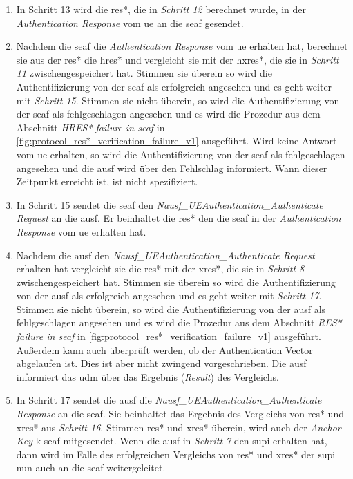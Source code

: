 \begin{enumerate}
\item In Schritt 13 wird die \gls{res*}, die in \textit{Schritt 12} berechnet wurde, in der \textit{Authentication Response} vom \gls{ue} an die \gls{seaf} gesendet.

\item Nachdem die \gls{seaf} die \textit{Authentication Response} vom \gls{ue} erhalten hat, berechnet sie aus der \gls{res*} die \gls{hres*} und vergleicht sie mit der \gls{hxres*}, die sie in \textit{Schritt 11} zwischengespeichert hat.
Stimmen sie überein so wird die Authentifizierung von der \gls{seaf} als erfolgreich angesehen und es geht weiter mit \textit{Schritt 15}.
Stimmen sie nicht überein, so wird die Authentifizierung von der \gls{seaf} als fehlgeschlagen angesehen und es wird die Prozedur aus dem Abschnitt \textit{HRES* failure in \gls{seaf}} in \cref{fig:protocol_res*_verification_failure_v1} ausgeführt.
Wird keine Antwort vom \gls{ue} erhalten, so wird die Authentifizierung von der \gls{seaf} als fehlgeschlagen angesehen und die \gls{ausf} wird über den Fehlschlag informiert.
Wann dieser Zeitpunkt erreicht ist, ist nicht spezifiziert.

\item In Schritt 15 sendet die \gls{seaf} den \textit{Nausf\_UEAuthentication\_Authenticate Request} an die \gls{ausf}.
Er beinhaltet die \gls{res*} den die \gls{seaf} in der \textit{Authentication Response} vom \gls{ue} erhalten hat.

\item Nachdem die \gls{ausf} den \textit{Nausf\_UEAuthentication\_Authenticate Request} erhalten hat vergleicht sie die \gls{res*} mit der \gls{xres*}, die sie in \textit{Schritt 8} zwischengespeichert hat.
Stimmen sie überein so wird die Authentifizierung von der \gls{ausf} als erfolgreich angesehen und es geht weiter mit \textit{Schritt 17}.
Stimmen sie nicht überein, so wird die Authentifizierung von der \gls{ausf} als fehlgeschlagen angesehen und es wird die Prozedur aus dem Abschnitt \textit{RES* failure in \gls{seaf}} in \cref{fig:protocol_res*_verification_failure_v1} ausgeführt.
Außerdem kann auch überprüft werden, ob der Authentication Vector abgelaufen ist.
Dies ist aber nicht zwingend vorgeschrieben.
Die \gls{ausf} informiert das \gls{udm} über das Ergebnis (\textit{Result}) des Vergleichs.

\item In Schritt 17 sendet die \gls{ausf} die \textit{Nausf\_UEAuthentication\_Authenticate Response} an die \gls{seaf}.
Sie beinhaltet das Ergebnis des Vergleichs von \gls{res*} und \gls{xres*} aus \textit{Schritt 16}.
Stimmen \gls{res*} und \gls{xres*} überein, wird auch der \textit{Anchor Key} \gls{k-seaf} mitgesendet.
Wenn die \gls{ausf} in \textit{Schritt 7} den \gls{supi} erhalten hat, dann wird im Falle des erfolgreichen Vergleichs von \gls{res*} und \gls{xres*} der \gls{supi} nun auch an die \gls{seaf} weitergeleitet.
\end{enumerate}


